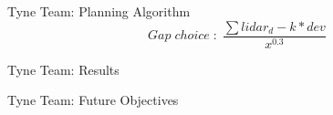 \documentclass[11pt]{beamer}
\begin{document}
\begin{frame}{Tyne Team: Planning Algorithm}
$$Gap \; choice \; : \; \frac{\sum lidar_d - k * dev}{x^{0.3}}$$
\end{frame}



\begin{frame}{Tyne Team: Results}
\end{frame}

\begin{frame}{Tyne Team: Future Objectives}
\end{frame}
\end{document}
